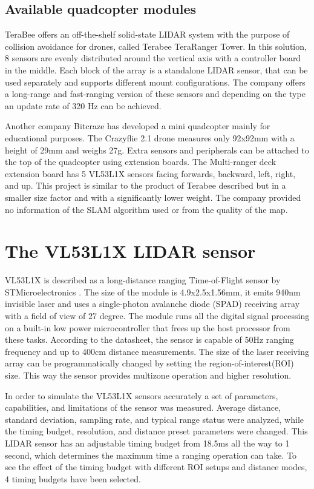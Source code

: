 \documentclass[conference]{IEEEtran}
\begin{document}
\subsection{Available quadcopter modules}

TeraBee offers an off-the-shelf solid-state LIDAR system with the purpose of collision avoidance for drones, called Terabee TeraRanger Tower. In this solution, 8 sensors are evenly distributed around the vertical axis with a controller board in the middle. Each block of the array is a standalone LIDAR sensor, that can be used separately and supports different mount configurations. The company offers a long-range and fast-ranging version of these sensors and depending on the type an update rate of 320 Hz can be achieved. 

Another company Bitcraze has developed a mini quadcopter mainly for educational purposes. The Crazyflie 2.1 drone measures only 92x92mm with a height of 29mm and weighs 27g. Extra sensors and peripherals can be attached to the top of the quadcopter using extension boards. The Multi-ranger deck extension board has 5 VL53L1X sensors facing forwards, backward, left, right, and up. This project is similar to the product of Terabee described but in a smaller size factor and with a significantly lower weight. The company provided no information of the SLAM algorithm used or from the quality of the map.

\section{The VL53L1X LIDAR sensor}

VL53L1X is described as a long-distance ranging Time-of-Flight sensor by STMicroelectronics \cite{VL53L1XDatasheet}. The size of the module is 4.9x2.5x1.56mm, it emits 940nm invisible laser and uses a single-photon avalanche diode (SPAD) receiving array with a field of view of 27 degree. The module runs all the digital signal processing on a built-in low power microcontroller that frees up the host processor from these tasks. According to the datasheet, the sensor is capable of 50Hz ranging frequency and up to 400cm distance measurements. The size of the laser receiving array can be programmatically changed by setting the region-of-interest(ROI) size. This way the sensor provides multizone operation and higher resolution. 

In order to simulate the VL53L1X sensors accurately a set of parameters, capabilities, and limitations of the sensor was measured. Average distance, standard deviation, sampling rate, and typical range status were analyzed, while the timing budget, resolution, and distance preset parameters were changed. This LIDAR sensor has an adjustable timing budget from 18.5ms all the way to 1 second, which determines the maximum time a ranging operation can take. To see the effect of the timing budget with different ROI setups and distance modes, 4 timing budgets have been selected. 
\end{document}

